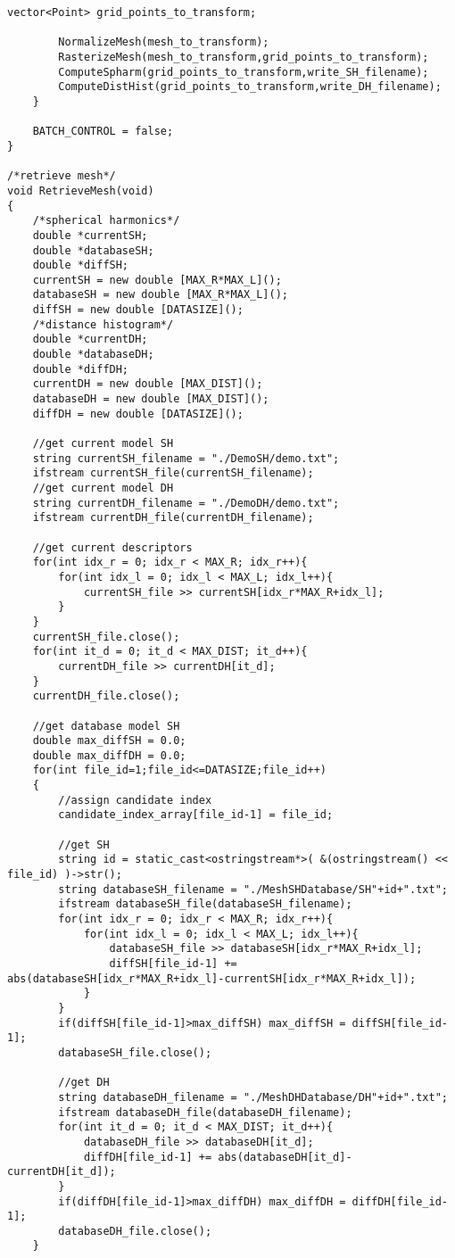 \begin{enumerate}[1.]
\begin{lstlisting}[xleftmargin=0em]
		vector<Point> grid_points_to_transform;

		NormalizeMesh(mesh_to_transform);
		RasterizeMesh(mesh_to_transform,grid_points_to_transform);
		ComputeSpharm(grid_points_to_transform,write_SH_filename);
		ComputeDistHist(grid_points_to_transform,write_DH_filename);
	}

	BATCH_CONTROL = false;
}

/*retrieve mesh*/
void RetrieveMesh(void)
{
	/*spherical harmonics*/
	double *currentSH;
	double *databaseSH;
	double *diffSH;
	currentSH = new double [MAX_R*MAX_L]();
	databaseSH = new double [MAX_R*MAX_L]();
	diffSH = new double [DATASIZE]();
	/*distance histogram*/
	double *currentDH;
	double *databaseDH;
	double *diffDH;
	currentDH = new double [MAX_DIST]();
	databaseDH = new double [MAX_DIST]();
	diffDH = new double [DATASIZE]();

	//get current model SH
	string currentSH_filename = "./DemoSH/demo.txt";
	ifstream currentSH_file(currentSH_filename);
	//get current model DH
	string currentDH_filename = "./DemoDH/demo.txt";
	ifstream currentDH_file(currentDH_filename);

	//get current descriptors
	for(int idx_r = 0; idx_r < MAX_R; idx_r++){
		for(int idx_l = 0; idx_l < MAX_L; idx_l++){
			currentSH_file >> currentSH[idx_r*MAX_R+idx_l];
		}
	}
	currentSH_file.close();
	for(int it_d = 0; it_d < MAX_DIST; it_d++){
		currentDH_file >> currentDH[it_d];
	}
	currentDH_file.close();

	//get database model SH
	double max_diffSH = 0.0;
	double max_diffDH = 0.0;
	for(int file_id=1;file_id<=DATASIZE;file_id++)
	{
		//assign candidate index
		candidate_index_array[file_id-1] = file_id;

		//get SH
		string id = static_cast<ostringstream*>( &(ostringstream() << file_id) )->str();
		string databaseSH_filename = "./MeshSHDatabase/SH"+id+".txt";
		ifstream databaseSH_file(databaseSH_filename);
		for(int idx_r = 0; idx_r < MAX_R; idx_r++){
			for(int idx_l = 0; idx_l < MAX_L; idx_l++){
				databaseSH_file >> databaseSH[idx_r*MAX_R+idx_l];
				diffSH[file_id-1] += abs(databaseSH[idx_r*MAX_R+idx_l]-currentSH[idx_r*MAX_R+idx_l]);
			}
		}
		if(diffSH[file_id-1]>max_diffSH) max_diffSH = diffSH[file_id-1]; 
		databaseSH_file.close();

		//get DH
		string databaseDH_filename = "./MeshDHDatabase/DH"+id+".txt";
		ifstream databaseDH_file(databaseDH_filename);
		for(int it_d = 0; it_d < MAX_DIST; it_d++){
			databaseDH_file >> databaseDH[it_d];
			diffDH[file_id-1] += abs(databaseDH[it_d]-currentDH[it_d]);
		}
		if(diffDH[file_id-1]>max_diffDH) max_diffDH = diffDH[file_id-1]; 
		databaseDH_file.close();
	}


\end{lstlisting}
\end{enumerate}
